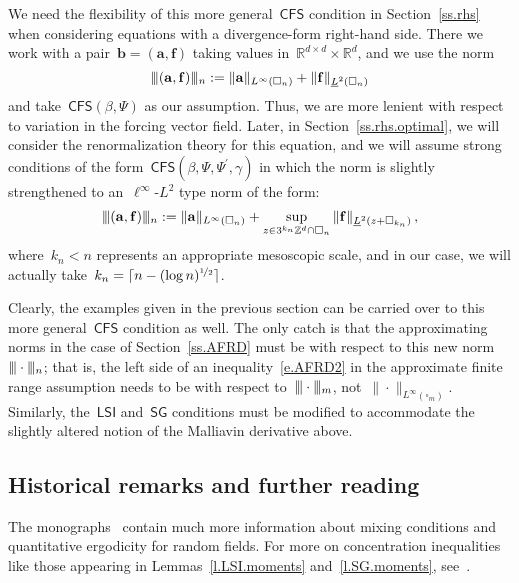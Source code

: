 \documentclass[11pt,twoside]{article} %
\let\oldsquare\square %
\renewcommand{\square}{\oldsquare}
\numberwithin{equation}{section}
\theoremstyle{definition}
\newcommand{\vertiii}{\vert\kern-0.3ex\vert\kern-0.25ex\vert}
\newcommand*{\R}{\ensuremath{\mathbb{R}}}
\newcommand*{\Zd}{\ensuremath{\mathbb{Z}^d}}
\newcommand*{\Rd}{\ensuremath{\mathbb{R}^d}}
\renewcommand{\b}{\ensuremath{\mathbf{b}}}
\newcommand{\f}{\mathbf{f}}
\renewcommand{\a}{\mathbf{a}}
\newcommand{\cu}{\square}
\newcommand{\CFS}{\mathsf{CFS}}
\newcommand{\LSI}{\mathsf{LSI}}
\newcommand{\SG}{\mathsf{SG}}
\begin{document}
We need the flexibility of this more general~$\CFS$ condition in Section~\ref{ss.rhs} when considering equations with a divergence-form right-hand side. There we work with a pair~$\b = (\a,\f)$ taking values in~$\R^{d\times d} \times \Rd$, and we use the norm
\begin{equation}
\label{e.triple.norm.sec6}
\vertiii (\a,\f) \vertiii_n:= \| \a \|_{L^\infty(\cu_n)} + \| \f \|_{\underline{L}^2(\cu_n)}
\end{equation}
and take~$\CFS(\beta,\Psi)$ as our assumption. Thus, we are more lenient with respect to variation in the forcing vector field. 
Later, in Section~\ref{ss.rhs.optimal}, we will consider the renormalization theory for this equation, and we will assume strong conditions of the form~$\CFS(\beta,\Psi,\Psi^\prime,\gamma)$ in which the norm is slightly strengthened to an~$\ell^\infty$-$L^2$ type norm of the form:
\begin{equation}
\label{e.triple.your.bar.meso}
\vertiii (\a,\f) \vertiii_n:= \| \a \|_{L^\infty(\cu_n)} 
+
\sup_{z\in 3^{k_n} \Zd \cap \cu_n}
\| \f \|_{\underline{L}^2(z+\cu_{k_n})}
\,,
\end{equation}
where~$k_n < n$ represents an appropriate mesoscopic scale, and in our case, we will actually take~$k_n =  \lceil n - (\log n)^{\nicefrac12} \rceil$.

\smallskip

Clearly, the examples given in the previous section can be carried over to this more general~$\CFS$ condition as well. The only catch is that the approximating norms in the case of Section~\ref{ss.AFRD} must be with respect to this new norm~$\vertiii \cdot \vertiii_n$; that is, the left side of an inequality~\eqref{e.AFRD2} in the approximate finite range assumption needs to be with respect to~$\vertiii \cdot \vertiii_m$, not~$\| \cdot\|_{L^\infty(\cu_m)}$. Similarly, the~$\LSI$ and~$\SG$ conditions must be modified to accommodate the slightly altered notion of the Malliavin derivative above. 

\subsection*{Historical remarks and further reading}

The monographs~\cite{Brad,B1,Torq} contain much more information about mixing conditions and quantitative ergodicity for random fields. For more on concentration inequalities like those appearing in Lemmas~\ref{l.LSI.moments} and~\ref{l.SG.moments}, see~\cite{BLM}. 
\end{document}
